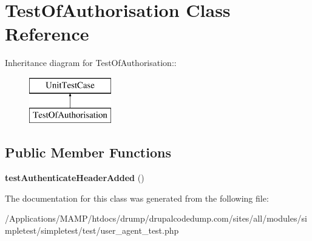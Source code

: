 \hypertarget{class_test_of_authorisation}{
\section{TestOfAuthorisation Class Reference}
\label{class_test_of_authorisation}
}
Inheritance diagram for TestOfAuthorisation::\begin{figure}[H]
\begin{center}
\leavevmode
\includegraphics[height=2cm]{class_test_of_authorisation}
\end{center}
\end{figure}
\subsection*{Public Member Functions}
\begin{DoxyCompactItemize}
\item 
\hypertarget{class_test_of_authorisation_ae3ea5957c1e6090c9a7623d71514517f}{
{\bfseries testAuthenticateHeaderAdded} ()}
\label{class_test_of_authorisation_ae3ea5957c1e6090c9a7623d71514517f}

\end{DoxyCompactItemize}


The documentation for this class was generated from the following file:\begin{DoxyCompactItemize}
\item 
/Applications/MAMP/htdocs/drump/drupalcodedump.com/sites/all/modules/simpletest/simpletest/test/user\_\-agent\_\-test.php\end{DoxyCompactItemize}

